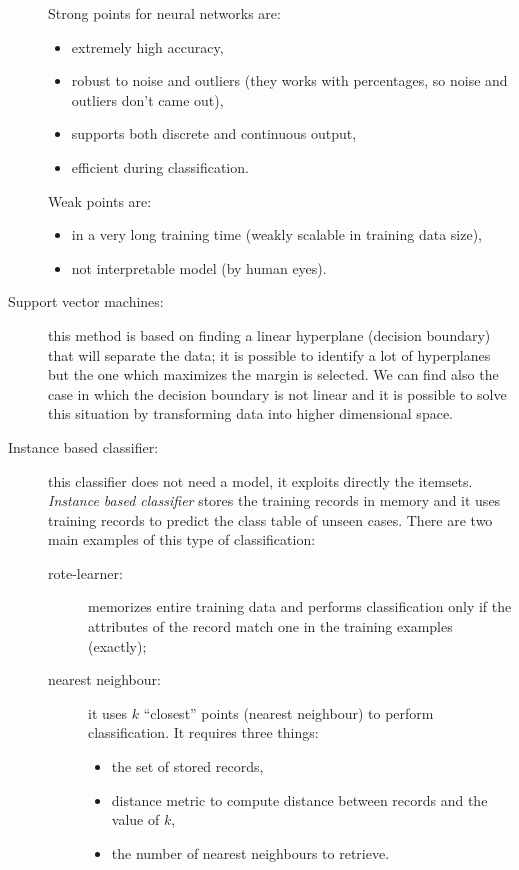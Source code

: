 \begin{description}
\begin{enumerate}
\begin{itemize}
		\end{itemize}
	\end{enumerate}
	Strong points for neural networks are:
	\begin{itemize}
		\item
		extremely high accuracy,
		\item
		robust to noise and outliers (they works with percentages, so noise and outliers don't came out),
		\item
		supports both discrete and continuous output,
		\item
		efficient during classification.
	\end{itemize}
	Weak points are:
	\begin{itemize}
		\item
		in a very long training time (weakly scalable in training data size),
		\item
		not interpretable model (by human eyes).
	\end{itemize}
	\item[Support vector machines:] this method is based on finding a linear hyperplane (decision boundary) that will separate the data; it is possible to identify a lot of hyperplanes but the one which maximizes the margin is selected.
	We can find also the case in which the decision boundary is not linear and it is possible to solve this situation by transforming data into higher dimensional space.
	\item[Instance based classifier:] this classifier does not need a model, it exploits directly the itemsets.
	\emph{Instance based classifier} stores the training records in memory and it uses training records to predict the class table of unseen cases.
	There are two main examples of this type of classification:
	\begin{description}
		\item[rote-learner:] memorizes entire training data and performs classification only if the attributes of the record match one in the training examples (exactly);
		\item[nearest neighbour:] it uses $k$ ``closest'' points (nearest neighbour) to perform classification.
		It requires three things:
		\begin{itemize}
			\item
			the set of stored records,
			\item
			distance metric to compute distance between records and the value of $k$,
			\item
			the number of nearest neighbours to retrieve.

\end{itemize}
\end{description}
\end{description}
